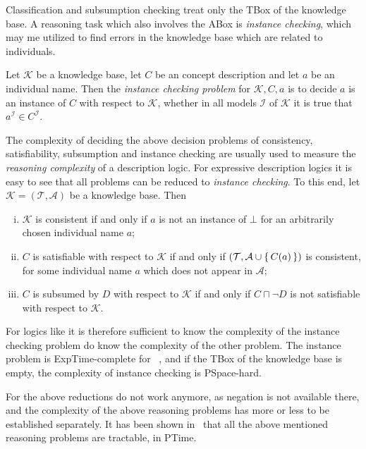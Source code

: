 Classification and subsumption checking treat only the TBox of the knowledge base.  A
reasoning task which also involves the ABox is \emph{instance checking}, which may me
utilized to find errors in the knowledge base which are related to individuals.

\begin{Definition}
  \label{def:instance-checking}
  Let $\mathcal{K}$ be a knowledge base, let $C$ be an concept description and let $a$ be
  an individual name.  Then the \emph{instance checking problem} for $\mathcal{K}, C, a$
  is to decide $a$ is an instance of $C$ with respect to $\mathcal{K}$, \ie whether in all
  models $\mathcal{I}$ of $\mathcal{K}$ it is true that $a^{\mathcal{I}} \in
  C^{\mathcal{I}}$.
\end{Definition}

The complexity of deciding the above decision problems of consistency, satisfiability,
subsumption and instance checking are usually used to measure the \emph{reasoning
  complexity} of a description logic.  For expressive description logics it is easy to see
that all problems can be reduced to \emph{instance checking}.  To this end, let
$\mathcal{K} = (\mathcal{T}, \mathcal{A})$ be a knowledge base.  Then
\begin{enumerate}[i. ]
\item $\mathcal{K}$ is consistent if and only if $a$ is not an instance of $\bot$ for an
  arbitrarily chosen individual name $a$;
\item $C$ is satisfiable with respect to $\mathcal{K}$ if and only if $(\mathcal{T},
  \mathcal{A} \cup {\ensuremath{\{\, C(a) \,\}}} )$ is consistent, for some individual name $a$ which does
  not appear in $\mathcal{A}$;
\item $C$ is subsumed by $D$ with respect to $\mathcal{K}$ if and only if $C \sqcap \neg
  D$ is not satisfiable with respect to $\mathcal{K}$.
\end{enumerate}
For logics like \ALC it is therefore sufficient to know the complexity of the instance
checking problem do know the complexity of the other problem.  The instance problem is
ExpTime-complete for \ALC~\cite{DLhandbook}, and if the TBox of the knowledge base is
empty, the complexity of instance checking is PSpace-hard.

For \ELbot the above reductions do not work anymore, as negation is not available there,
and the complexity of the above reasoning problems has more or less to be established
separately.  It has been shown in~\cite{DBLP:conf/ijcai/Baader03a,
  DBLP:conf/ecai/Brandt04, DBLP:conf/ijcai/BaaderBL05} that all the above mentioned
reasoning problems are tractable, \ie in PTime.

